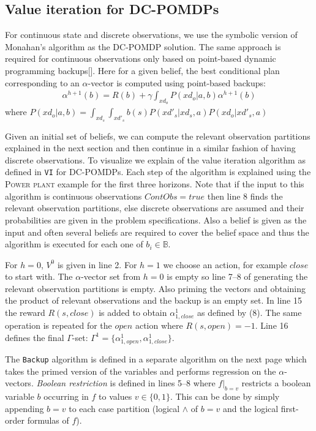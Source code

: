 \documentclass{article} %
\begin{document}
\subsection{Value iteration for DC-POMDPs} 

For continuous state and discrete observations, we use the symbolic version of Monahan's algorithm as the DC-POMDP solution. The same approach is required for continuous observations only based on point-based dynamic programming backups[]. Here for a given belief, the best conditional plan corresponding to an $\alpha$-vector is computed using point-based backups: 
\begin{align*}
\alpha^{h+1}(b) = R(b) + \gamma \int_{xd_o} P(xd_o|a,b)\alpha^{h+1}(b)\nonumber
\end{align*}
where $P(xd_o|a,b) = \int_{xd_s}\int_{xd'_s}b(s)P(xd'_s|xd_s,a)P(xd_o|xd'_s,a)$

Given an initial set of beliefs, we can compute the relevant observation partitions explained in the next section and then continue in a similar fashion of having discrete observations. To visualize we explain of the value iteration algorithm as defined in \texttt{VI} for DC-POMDPs. Each step of the algorithm is explained using the \textsc{Power plant} example for the first three horizons. Note that if the input to this algorithm is continuous observations $ContObs=true$ then line 8 finds the relevant observation partitions, else discrete observations are assumed and their probabilities are given in the problem specifications. Also a belief is given as the input and often several beliefs are required to cover the belief space and thus the algorithm is executed for each one of $b_i \in \mathbb{B}$.

For $h=0$, $V^0$ is given in line 2.  For $h=1$ we choose an action, for example $close$ to start with. The $\alpha$-vector set from $h=0$ is empty so line 7--8 of generating the relevant observation partitions is empty. Also priming the vectors and obtaining the product of relevant observations and the backup is an empty set. In line 15 the reward $R(s,close)$ is added to obtain $\alpha^1_{1,close}$ as defined by (8). The same operation is repeated for the $open$ action where $R(s,open)=-1$. Line 16 defines the final $\Gamma$-set: 
$\Gamma^1 = \{ \alpha^1_{1,open}, \alpha^1_{1,close} \}$.

The \texttt{Backup} algorithm is defined in a separate algorithm on the next page which takes the primed version of the variables and performs regression on the $\alpha$-vectors. 
\emph{Boolean restriction} is defined in lines 5--8 where $f|_{b=v}$ restricts a boolean variable $b$ occurring in $f$ to values $v \in \{ 0,1 \}$. This can be done by simply appending $b=v$ to each case partition (logical $\wedge$ of $b=v$ and the logical first-order formulas of $f$). 
\end{document}
